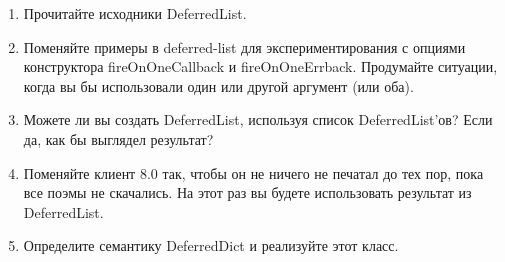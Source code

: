 \begin{enumerate}
\item Прочитайте исходники DeferredList.

\item Поменяйте примеры в deferred-list для экспериментирования с 
    опциями конструктора fireOnOneCallback и fireOnOneErrback. Продумайте 
    ситуации, когда вы бы использовали один или другой аргумент (или оба).

\item Можете ли вы создать DeferredList, используя список DeferredList'ов? 
    Если да, как бы выглядел результат?

\item Поменяйте клиент 8.0 так, чтобы он не ничего не печатал до тех 
    пор, пока все поэмы не скачались. На этот раз вы будете использовать 
    результат из DeferredList.

\item Определите семантику DeferredDict и реализуйте этот класс.

\end{enumerate}

